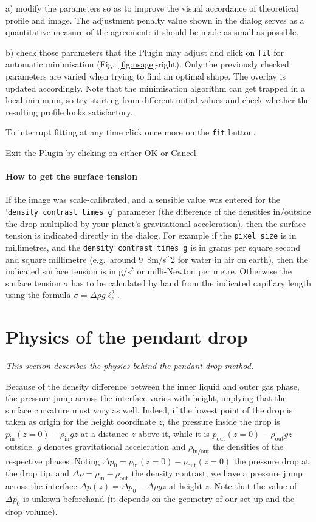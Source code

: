 \documentclass[fleqn]{scrartcl}
\begin{document}
a) modify the parameters so as to improve the visual accordance of
theoretical profile and image. The adjustment penalty value shown in
the dialog serves as a quantitative measure of the agreement: it
should be made as small as possible.

b) check those parameters that the Plugin may adjust and click on
\texttt{fit} for automatic minimisation (Fig.~\ref{fig:usage}-right).
Only the previously checked parameters are varied when trying to find
an optimal shape. The overlay is updated accordingly. Note that the
minimisation algorithm can get trapped in a local minimum, so try
starting from different initial values and check whether the resulting
profile looks satisfactory.

To interrupt fitting at any time click once more on the \texttt{fit}
button.

Exit the Plugin by clicking on either OK or Cancel.

\paragraph{How to get the surface tension}
If the image was scale-calibrated, and a sensible value was entered
for the `\texttt{density contrast times g}' parameter (the difference
of the densities in/outside the drop multiplied by your planet's
gravitational acceleration), then the surface tension is indicated
directly in the dialog. For example if the \texttt{pixel size} is in
millimetres, and the \texttt{density contrast times g} is in grams per
square second and square millimetre (e.g.\ around
\unit{9.8}{m/s^2} for water in air on
earth), then the indicated surface tension is in
$\mathrm{g}/\mathrm{s}^2$ or milli-Newton per metre. Otherwise the
surface tension $\sigma$ has to be calculated by hand from the
indicated capillary length using the formula $\sigma = \Delta\!\rho g
\ell_c^2$.


\section{Physics of the pendant drop}
\label{sec:theory}

\textit{\small This section describes the physics behind the pendant drop method.\medskip}

Because of the density difference between the inner liquid and outer
gas phase, the pressure jump across the interface varies with height,
implying that the surface curvature must vary as well. Indeed, if the
lowest point of the drop is taken as origin for the height coordinate
$z$, the pressure inside the drop is $p_{\mathrm{in}}(z=0) -
\rho_{\mathrm{in}} g z$ at a distance $z$ above it, while it is
$p_{\mathrm{out}}(z=0) - \rho_{\mathrm{out}} g z$ outside. $g$ denotes
gravitational acceleration and $\rho_{\mathrm{in/out}}$ the densities
of the respective phases. Noting $\Delta\! p_0 = p_{\mathrm{in}}(z=0)
- p_{\mathrm{out}}(z=0)$ the pressure drop at the drop tip, and
$\Delta\!\rho = \rho_{\mathrm{in}} - \rho_{\mathrm{out}}$ the density
contrast, we have a pressure jump across the interface $\Delta\! p(z)
= \Delta\! p_0 - \Delta\!\rho g z$ at height $z$. Note that the value
of $\Delta\! p_0$ is unkown beforehand (it depends on the geometry of
our set-up and the drop volume).
\end{document}
